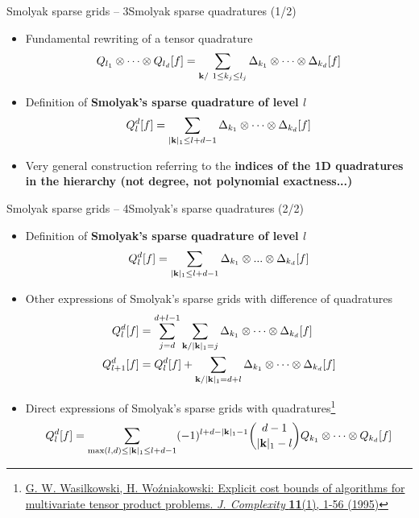 \documentclass[10pt]{beamer}
\def\vt{\vspace{2mm}}
\def\begit{\begin{itemize}}
\def\endit{\end{itemize}}
\begin{document}
%
%
\begin{frame}{Smolyak sparse grids -- 3}{Smolyak sparse quadratures (1/2)}
%
\footnotesize{
%
\begit
%
\item Fundamental rewriting of a tensor quadrature
 $$  Q_{l_1}\otimes\cdots \otimes Q_{l_d}[f] = \sum_{{\bf k}/~ 1\leq k_j \leq l_j} \Delta_{k_1} \otimes \cdots \otimes \Delta_{k_d}[f]  $$
%
\vt
\item Definition of {\bf Smolyak's sparse quadrature of level  $l$ }
$$  Q_l^d [f] = \sum_{|{\bf k}|_1 \leq l+d-1} \Delta_{k_1} \otimes \cdots \otimes \Delta_{k_d} [f] $$ 

\vt
\item Very general construction referring to the {\bf indices of the 1D quadratures in the hierarchy (not degree, not polynomial exactness...) }
\endit
%
}
%
\end{frame}
%
%
\begin{frame}{Smolyak sparse grids -- 4}{Smolyak's sparse quadratures (2/2)}
%
\footnotesize{
%
\begit
%
\item Definition of {\bf Smolyak's sparse quadrature of level  $l$ }
$$  Q_l^d [f] = \sum_{|{\bf k}|_1 \leq l+d-1} \Delta_{k_1} \otimes ...  \otimes \Delta_{k_d} [f] $$ 
\vt
\item Other expressions of Smolyak's sparse grids with difference of quadratures
\begin{displaymath}
\begin{split}
Q_l^d [f]  &= \sum_{j=d}^{d+l-1} \sum_{{\bf k}/|{\bf k}|_1=j} \Delta_{k_1} \otimes \cdots \otimes \Delta_{k_d} [f] \\
Q_{l+1}^d [f]  &=   Q_l^d [f]+  \sum_{{\bf k}/|{\bf k}|_1=d+l} \Delta_{k_1} \otimes \cdots \otimes \Delta_{k_d} [f] 
\end{split}
\end{displaymath}

\item Direct expressions of Smolyak's sparse grids with quadratures\footnote{\href{\webDOI/10.1006/jcom.1995.1001}{\scriptsize{G. W. Wasilkowski, H. Wo\'zniakowski: Explicit cost bounds of algorithms for multivariate tensor product problems. {\sl J. Complexity} {\bf 11}(1), 1-56 (1995)}}}
$$
   Q_l^d [f] = \sum_{\max(l,d)\leq |{\bf k}|_1 \leq l+d-1} (-1)^{l+d-|{\bf k}|_1-1}\binom{d-1}{|{\bf k}|_1-l}
  Q_{k_1} \otimes \cdots \otimes Q_{k_d} [f]
$$
\endit
%
}
%
\end{frame}
\end{document}
